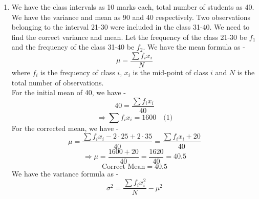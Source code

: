 \begin{enumerate}
    \begin{enumerate}
        \item Correct Mean:
        We have -
        \[ \text{Correct Sum} = \text{Original Sum} - \text{Wrong Value} + \text{Correct Value}\]
        \[= 100 \cdot 40.1 - 50 + 40\]
        \[= 4010 - 50 + 40 = 4000\]
        \[ \text{Correct Mean} = \frac{\text{Correct Sum}}{100} = \frac{4000}{100} = 40\]
        \[\boxed{\text{Correct Mean} = 40
        }\]
        \item Correct Standard Deviation:
        We have the formula for standard deviation as -
        \[\sigma = \sqrt{\frac{\sum x_i^2}{N} - \mu^2}\]
        where $x_i$ are the observations, $N$ is the number of observations and $\mu$ is the mean. Thus, we have -
        \[5 = \sqrt{\frac{\sum x_i^2}{100} - (40.1)^2}\]
        \[25 = \frac{\sum x_i^2}{100} - 1608.01\]
        \[\sum x_i^2 = 162833.01\]
        Now, we need to find the correct value of $\sum x_i^2$. We have -
        \[\text{Correct } \sum x_i^2 = \text{Original } \sum x_i^2 - (\text{Wrong Value})^2 + (\text{Correct Value})^2\]
        \[= 162833.01 - 50^2 + 40^2\]
        \[= 162833.01 - 2500 + 1600 = 161933.01\]
        Thus, we have the correct standard deviation as -
        \[\sigma = \sqrt{\frac{161933.01}{100} - (40)^2} = \sqrt{1619.3301 - 1600} = \sqrt{19.3301} \approx 4.396\]
        \[\boxed{\text{Correct Standard Deviation} \approx 4.396
        }\]
    \end{enumerate}
    \item We have the class intervals as 10 marks each, total number of students as 40. We have the variance and mean as 90 and 40 respectively. Two observations belonging to the interval 21-30 were included in the class 31-40. We need to find the correct variance and mean. 
    Let the frequency of the class 21-30 be $f_1$ and the frequency of the class 31-40 be $f_2$. We have the mean formula as -
    \[\mu = \frac{\sum f_i x_i}{N}\]
    where $f_i$ is the frequency of class $i$, $x_i$ is the mid-point of class $i$ and $N$ is the total number of observations. \\
    For the initial mean of 40, we have -
    \[40 = \frac{\sum f_i x_i}{40}\]
    \[\Rightarrow \sum f_i x_i = 1600 \quad \text{(1)}\]
    For the corrected mean, we have -
    \[\mu = \frac{\sum f_i x_i - 2 \cdot 25 + 2 \cdot 35}{40} = \frac{\sum f_i x_i + 20}{40}\]
    \[\Rightarrow \mu = \frac{1600 + 20}{40} = \frac{1620}{40} = 40.5\]
    \[\boxed{\text{Correct Mean} = 40.5
    }\]
    We have the variance formula as -
    \[\sigma^2 = \frac{\sum f_i x_i^2}{N} - \mu^2\]

\end{enumerate}
